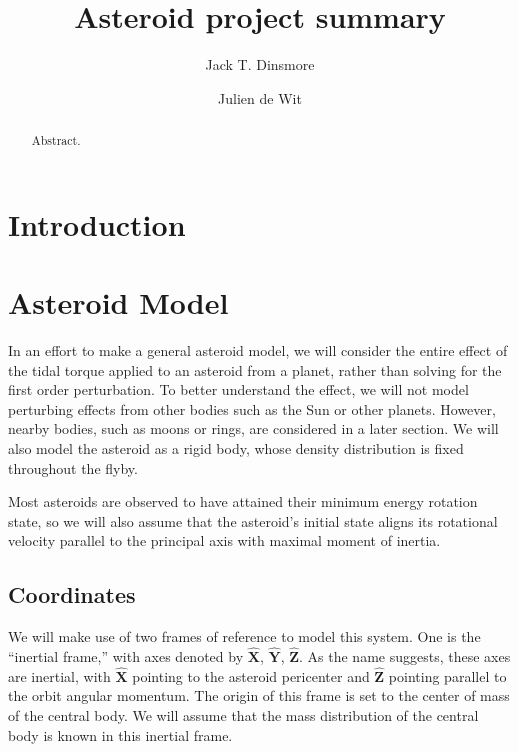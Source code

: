 \documentclass[linenumbers]{aastex631}
\newcommand{\unit}[1]{\hat{\mathbf{#1}}}
\begin{document}
\title{Asteroid project summary}


\author[0000-0002-6401-778X]{Jack T. Dinsmore}

\author{Julien de Wit}

\begin{abstract}

Abstract. 
\end{abstract}




\section{Introduction}


\section{Asteroid Model}
In an effort to make a general asteroid model, we will consider the entire effect of the tidal torque applied to an asteroid from a planet, rather than solving for the first order perturbation. To better understand the effect, we will not model perturbing effects from other bodies such as the Sun or other planets. However, nearby bodies, such as moons or rings, are considered in a later section. We will also model the asteroid as a rigid body, whose density distribution is fixed throughout the flyby.

Most asteroids are observed to have attained their minimum energy rotation state, so we will also assume that the asteroid's initial state aligns its rotational velocity parallel to the principal axis with maximal moment of inertia.

\subsection{Coordinates}
\label{sec:coordinates}
We will make use of two frames of reference to model this system. One is the ``inertial frame,'' with axes denoted by $\unit{X}$, $\unit{Y}$, $\unit{Z}$. As the name suggests, these axes are inertial, with $\unit{X}$ pointing to the asteroid pericenter and $\unit{Z}$ pointing parallel to the orbit angular momentum. The origin of this frame is set to the center of mass of the central body. We will assume that the mass distribution of the central body is known in this inertial frame.
\end{document}
